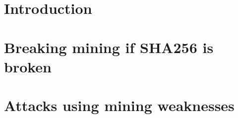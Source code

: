 \documentclass[a4paper,twoside,10pt]{report}
\begin{document}

\thispagestyle{empty}

\tableofcontents %
\thispagestyle{empty}
\clearpage



\chapter{Introduction}
\setcounter{page}{1}

  

  

  


%  

%  

\chapter{Breaking mining if SHA256 is broken}

	

  

  

  

  

\chapter{Attacks using mining weaknesses}

  

  


\appendix



\nocite{*}


\end{document}
